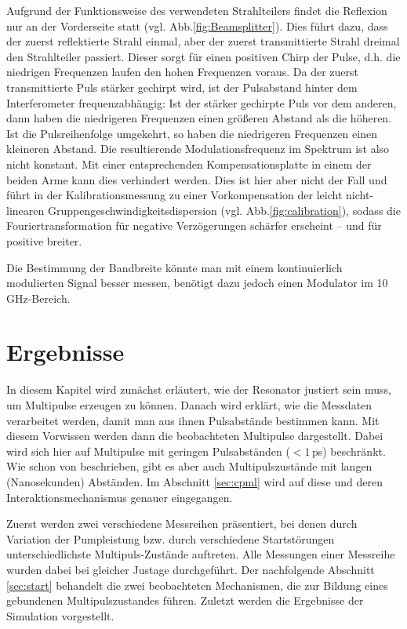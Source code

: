 \documentclass[bachelor,       %
               twoside,        %
               BCOR10mm,       %
               liststotoc,nomtotoc,bibtotoc, %
               english,ngerman, %
               final,          %
               ]{GAUBM}
\begin{document}
Aufgrund der Funktionsweise des verwendeten Strahlteilers findet die Reflexion nur an der Vorderseite statt (vgl. Abb.\ref{fig:Beamsplitter}).
Dies führt dazu, dass der zuerst reflektierte Strahl einmal, aber der zuerst transmittierte Strahl dreimal den Strahlteiler passiert.
Dieser sorgt für einen positiven Chirp der Pulse, d.h. die niedrigen Frequenzen laufen den hohen Frequenzen voraus.
Da der zuerst transmittierte Puls stärker gechirpt wird, ist der Pulsabstand   hinter dem Interferometer frequenzabhängig: Ist der stärker gechirpte Puls vor dem anderen, dann haben die niedrigeren Frequenzen einen größeren Abstand als die höheren. Ist die Pulsreihenfolge umgekehrt, so haben die niedrigeren Frequenzen einen kleineren Abstand.
Die resultierende Modulationsfrequenz im Spektrum ist also nicht konstant.
Mit einer entsprechenden Kompensationsplatte in einem der beiden Arme kann dies verhindert werden.
Dies ist hier aber nicht der Fall und führt in der Kalibrationsmessung zu einer Vorkompensation der leicht nicht-linearen Gruppengeschwindigkeitsdispersion (vgl. Abb.\ref{fig:calibration}), sodass die Fouriertransformation für negative Verzögerungen schärfer erscheint -- und für positive breiter.


Die Bestimmung der Bandbreite könnte man mit einem kontinuierlich modulierten Signal besser messen, benötigt dazu jedoch einen Modulator im 10\,GHz-Bereich.

\chapter{Ergebnisse}
In diesem Kapitel wird zunächst erläutert, wie der Resonator justiert sein muss, um Multipulse erzeugen zu können.
Danach wird erklärt, wie die Messdaten verarbeitet werden, damit man aus ihnen Pulsabstände bestimmen kann.
Mit diesem Vorwissen werden dann die beobachteten Multipulse dargestellt.
Dabei wird sich hier auf Multipulse mit geringen Pulsabständen ($< 1\,$ps) beschränkt.
Wie schon von \cite{lai_multiple_1997} beschrieben, gibt es aber auch Multipulszustände mit langen (Nanosekunden) Abständen.
Im Abschnitt \ref{sec:cpml} wird auf diese und deren Interaktionsmechanismus genauer eingegangen.

Zuerst werden zwei verschiedene Messreihen präsentiert, bei denen durch Variation der Pumpleistung bzw. durch verschiedene Startstörungen unterschiedlichste Multipuls-Zustände auftreten.
Alle Messungen einer Messreihe wurden dabei bei gleicher Justage durchgeführt.
Der nachfolgende Abschnitt \ref{sec:start} behandelt die zwei beobachteten Mechanismen, die zur Bildung eines gebundenen Multipulszustandes führen.
Zuletzt werden die Ergebnisse der Simulation vorgestellt.
\end{document}
